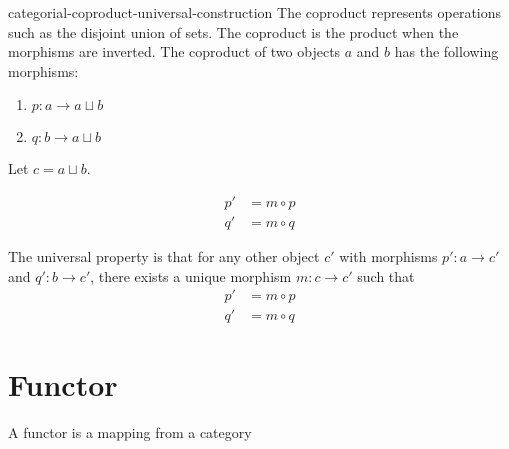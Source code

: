 \documentclass[preview]{standalone}
\begin{document}
\begin{snippet}{categorial-coproduct-universal-construction}
The coproduct represents operations
such as the disjoint union of sets.
The coproduct is the product when the morphisms are inverted.
The coproduct of two objects \(a\) and \(b\) has the following
morphisms:
\begin{enumerate}
    \item \(p:a \to a\sqcup b\)
    \item \(q:b \to a\sqcup b\)
\end{enumerate}

Let \(c=a\sqcup b\).

\begin{minipage}{0.5\textwidth}
\end{minipage}
\begin{minipage}{0.5\textwidth}
    \begin{align*}
        p' &= m \circ p \\
        q' &= m \circ q
    \end{align*}
\end{minipage}

The universal property is that for any other object \(c'\)
with morphisms \(p':a \to c'\) and \(q':b \to c'\),
there exists a unique morphism \(m:c \to c'\)
such that
\begin{align*}
    p' &= m \circ p \\
    q' &= m \circ q
\end{align*}
\end{snippet}

\section{Functor}

A functor is a mapping from a category
\end{document}
